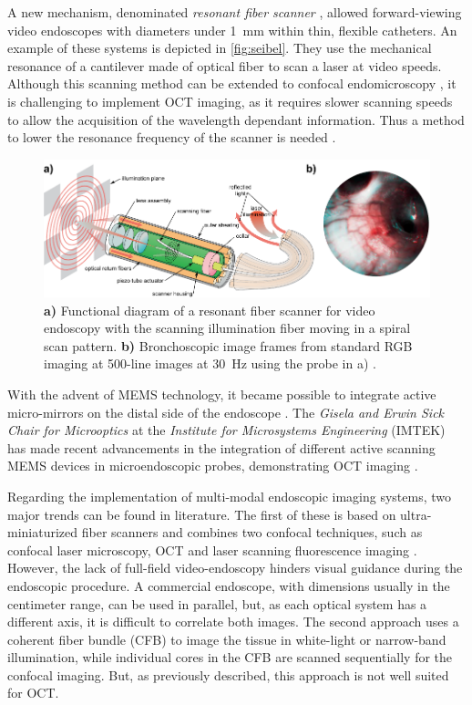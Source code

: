 A new mechanism, denominated \textit{resonant fiber scanner} \cite{Seibel2001}, allowed forward-viewing video endoscopes with diameters under \SI{1}{\milli\meter} within thin, flexible catheters. An example of these systems is depicted in \autoref{fig:seibel}. They use the mechanical resonance of  a cantilever made of optical fiber to scan a laser at video speeds. Although this scanning method can be extended to confocal endomicroscopy \cite{Meinert}, it is challenging to implement OCT imaging, as it requires slower scanning speeds to allow the acquisition of the wavelength dependant information. Thus a method to lower the resonance frequency of the scanner is needed \cite{Huo2010}.

\begin{figure}[h!]\centering
      \includegraphics{figures/10_Introduction/seibel.pdf}
      \caption{\textbf{a)} Functional diagram of a resonant fiber scanner for video endoscopy with the scanning illumination fiber moving in a spiral scan pattern. \textbf{b)} Bronchoscopic image frames from standard RGB imaging at 500-line images at \SI{30}{\hertz} using the probe in a) \cite{Lee2010}.}
      \label{fig:seibel}
\end{figure}

With the advent of MEMS technology, it became possible to integrate active micro-mirrors on the distal side of the endoscope \cite{Liu2011}. The \emph{Gisela and Erwin Sick Chair for Microoptics} at the \emph{Institute for Microsystems Engineering} (IMTEK) has made recent advancements in the integration of different active scanning MEMS devices in microendoscopic probes, demonstrating OCT imaging \cite{Weber2012}.

Regarding the implementation of multi-modal endoscopic imaging systems, two major trends can be found in literature. The first of these is based on ultra-miniaturized fiber scanners and combines two confocal techniques, such as confocal laser microscopy, OCT and laser scanning fluorescence imaging \cite{Lorenser2013,Yoo2011}. However, the lack of full-field video-endoscopy hinders visual guidance during the endoscopic procedure. A commercial endoscope, with dimensions usually in the centimeter range, can be used in parallel, but, as each optical system has a different axis, it is difficult to correlate both images. The second approach uses a coherent fiber bundle (CFB) to image the tissue in white-light or narrow-band illumination, while individual cores in the CFB are scanned sequentially for the confocal imaging. But, as previously described, this approach is not well suited for OCT.

